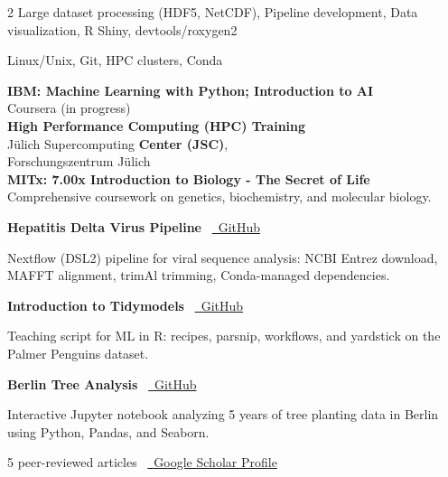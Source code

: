 \documentclass{thejus_cv}
\begin{document}
\begin{paracol}{2}
         {Large dataset processing (HDF5, NetCDF), Pipeline development, Data visualization, R Shiny, devtools/roxygen2}

         {Linux/Unix, Git, HPC clusters, Conda}



\textbf{IBM: Machine Learning with Python; Introduction to AI}\\
{\small Coursera (in progress)}\\[0.3cm]

\textbf{High Performance Computing (HPC) Training}\\
J\"ulich Supercomputing \textbf{Center (JSC)},\\
Forschungszentrum J\"ulich\\[0.3cm]

\textbf{MITx: 7.00x Introduction to Biology - The Secret of Life}\\
{\small Comprehensive coursework on genetics, biochemistry, and molecular biology.}\\[0.4cm]


\textbf{Hepatitis Delta Virus Pipeline} \textbullet\ \href{https://github.com/thejusmahajan/hepatitis-delta-pipeline}{\faGithub\ GitHub}\par
{\small Nextflow (DSL2) pipeline for viral sequence analysis: NCBI Entrez download, MAFFT alignment, trimAl trimming, Conda-managed dependencies.}\par
\vspace{0.3em}

\textbf{Introduction to Tidymodels} \textbullet\ \href{https://github.com/thejusmahajan/Introduction_to_Tidymodels}{\faGithub\ GitHub}\par
{\small Teaching script for ML in R: recipes, parsnip, workflows, and yardstick on the Palmer Penguins dataset.}\par
\vspace{0.3em}

\textbf{Berlin Tree Analysis} \textbullet\ \href{https://github.com/thejusmahajan/berlin-tree-analysis}{\faGithub\ GitHub}\par
{\small Interactive Jupyter notebook analyzing 5 years of tree planting data in Berlin using Python, Pandas, and Seaborn.}\par
\vspace{0.4em}


5 peer-reviewed articles \textbullet\ \href{https://scholar.google.com/citations?user=PJkZwAwAAAAJ}{\faGraduationCap\ Google Scholar Profile}



\end{paracol}
\end{document}
